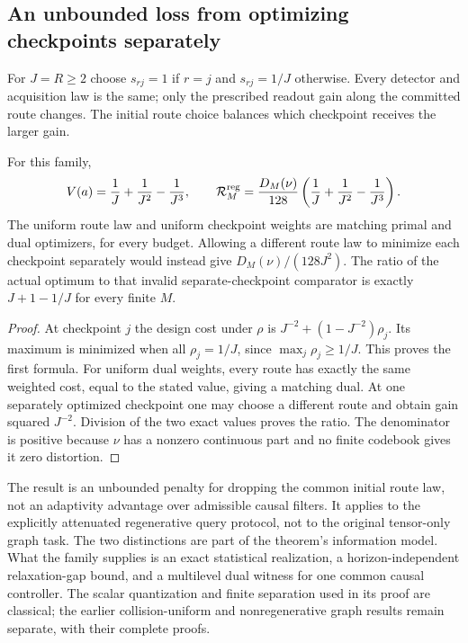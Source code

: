 \subsection{An unbounded loss from optimizing checkpoints separately}
For $J=R\ge2$ choose $s_{rj}=1$ if $r=j$ and $s_{rj}=1/J$ otherwise.
Every detector and acquisition law is the same; only the prescribed
readout gain along the committed route changes. The initial route
choice balances which checkpoint receives the larger gain.

\begin{corollary}
\label{cor:v30-checkpoint-gap}
For this family,
\begin{equation}\label{eq:v30-balanced-family}
 V(a)=\frac1J+\frac1{J^2}-\frac1{J^3},\qquad
 \mathcal R_M^{\rm reg}
   =\frac{D_M(\nu)}{128}
           \left(\frac1J+\frac1{J^2}-\frac1{J^3}\right).
\end{equation}
The uniform route law and uniform checkpoint weights are matching
primal and dual optimizers, for every budget. Allowing a different
route law to minimize each checkpoint separately would instead give
$D_M(\nu)/(128J^2)$. The ratio of the actual optimum to that invalid
separate-checkpoint comparator is exactly $J+1-1/J$ for every finite
$M$.
\end{corollary}
\begin{proof}
At checkpoint $j$ the design cost under $\rho$ is
$J^{-2}+(1-J^{-2})\rho_j$. Its maximum is minimized when all
$\rho_j=1/J$, since $\max_j\rho_j\ge1/J$. This proves the first
formula. For uniform dual weights, every route has exactly the same
weighted cost, equal to the stated value, giving a matching dual.
At one separately optimized checkpoint one may choose a different
route and obtain gain squared $J^{-2}$. Division of the two exact
values proves the ratio. The denominator is positive because $\nu$
has a nonzero continuous part and no finite codebook gives it zero
distortion.
\end{proof}

The result is an unbounded penalty for dropping the common initial
route law, not an adaptivity advantage over admissible causal filters.
It applies to the explicitly attenuated regenerative query protocol,
not to the original tensor-only graph task. The two distinctions are
part of the theorem's information model. What the family supplies is
an exact statistical realization, a horizon-independent relaxation-gap
bound, and a multilevel dual witness for one common causal controller.
The scalar quantization and finite separation used in its proof are
classical; the earlier collision-uniform and nonregenerative graph
results remain separate, with their complete proofs.
